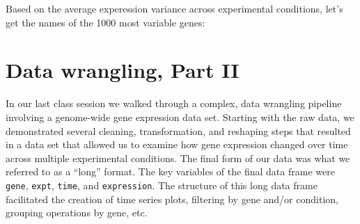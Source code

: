 \documentclass[]{book}
\newenvironment{Shaded}{\begin{snugshade}}{\end{snugshade}}
\newcommand{\CommentTok}[1]{\textcolor[rgb]{0.56,0.35,0.01}{\textit{#1}}}
\newcommand{\DataTypeTok}[1]{\textcolor[rgb]{0.13,0.29,0.53}{#1}}
\newcommand{\DecValTok}[1]{\textcolor[rgb]{0.00,0.00,0.81}{#1}}
\newcommand{\FloatTok}[1]{\textcolor[rgb]{0.00,0.00,0.81}{#1}}
\newcommand{\KeywordTok}[1]{\textcolor[rgb]{0.13,0.29,0.53}{\textbf{#1}}}
\newcommand{\NormalTok}[1]{#1}
\newcommand{\OperatorTok}[1]{\textcolor[rgb]{0.81,0.36,0.00}{\textbf{#1}}}
\newcommand{\OtherTok}[1]{\textcolor[rgb]{0.56,0.35,0.01}{#1}}
\newcommand{\StringTok}[1]{\textcolor[rgb]{0.31,0.60,0.02}{#1}}
\theoremstyle{definition}
\theoremstyle{definition}
\theoremstyle{definition}
\theoremstyle{remark}
\begin{document}
\begin{Shaded}
\end{Shaded}

Based on the average experession variance across experimental
conditions, let's get the names of the 1000 most variable genes:

\begin{Shaded}
\end{Shaded}

\hypertarget{data-wrangling-part-ii}{%
\chapter{Data wrangling, Part II}\label{data-wrangling-part-ii}}

In our last class session we walked through a complex, data wrangling
pipeline involving a genome-wide gene expression data set. Starting with
the raw data, we demonstrated several cleaning, transformation, and
reshaping steps that resulted in a data set that allowed us to examine
how gene expression changed over time across multiple experimental
conditions. The final form of our data was what we referred to as a
``long'' format. The key variables of the final data frame were
\texttt{gene}, \texttt{expt}, \texttt{time}, and \texttt{expression}.
The structure of this long data frame facilitated the creation of time
series plots, filtering by gene and/or condition, grouping operations by
gene, etc.
\end{document}
